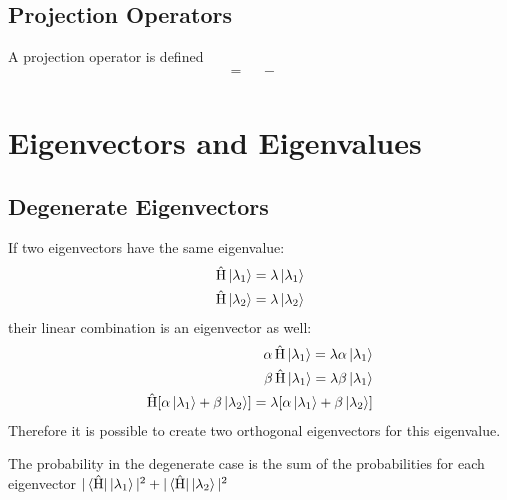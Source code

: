 \documentclass[10pt,a4paper]{book}
\DeclareMathOperator {\opH} {\hat{H}}
\DeclareMathOperator {\opA} {\hat{A}}
\DeclareMathOperator {\opB} {\hat{B}}
\begin{document}
    \section{Projection Operators}
    A projection operator is defined
    \begin{align}
    [\opA, \opB] = \opA\opB - \opB\opA \\
    \end{align}  
    \chapter{Eigenvectors and Eigenvalues}
    \section{Degenerate Eigenvectors}
    If two eigenvectors have the same eigenvalue:
    \begin{align}
    \opH\ket{\lambda_1} = \lambda \ket{\lambda_1} \\
    \opH\ket{\lambda_2} = \lambda \ket{\lambda_2} 
    \end{align}
    their linear combination is an eigenvector as well:
    \begin{align}
    \alpha \opH\ket{\lambda_1} = \lambda \alpha \ket{\lambda_1} \\
    \beta \opH\ket{\lambda_1} = \lambda \beta \ket{\lambda_1} \\
    \opH[\alpha \ket{\lambda_1} + \beta \ket{\lambda_2}] = \lambda [\alpha \ket{\lambda_1} + \beta \ket{\lambda_2}]    
    \end{align}
    Therefore it is possible to create two orthogonal eigenvectors for this eigenvalue.
    
    The probability in the degenerate case is the sum of the probabilities for each eigenvector $| \bra{\opH} \ket{\lambda_1}|^2 + | \bra{\opH} \ket{\lambda_2}|^2$
    
\end{document}
